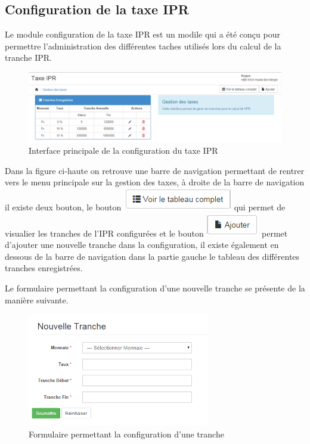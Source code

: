 \documentclass[12pt,a4paper]{report}
\begin{document}
\subsection{Configuration de la taxe IPR}
Le module configuration de la taxe IPR est un modile qui a été conçu pour permettre l'administration des différentes taches utilisés lors du calcul de la tranche IPR. 
\begin{figure}[h]
\begin{center}
\includegraphics[width=14cm]{pic/TaxeIPR.png}
\end{center}
\caption{Interface principale de la configuration du taxe IPR}
\label{Interface principale de la configuration du taxe IPR}
\end{figure}

Dans la figure ci-haute on retrouve une barre de navigation permettant de rentrer vers le menu principale sur la gestion des taxes, à droite de la barre de navigation il existe deux bouton, le bouton \includegraphics[scale=1]{pic/TabComplet.png} qui permet de visualier les tranches de l'IPR configurées et le bouton \includegraphics[scale=1]{pic/AddIPR.png} permet d'ajouter une nouvelle tranche dans la configuration, il existe également en dessous de la barre de navigation dans la partie gauche le tableau des différentes tranches enregistrées.

Le formulaire permettant la configuration d'une nouvelle tranche se présente de la manière suivante. 

\begin{figure}[h]
\begin{center}
\includegraphics[width=8cm]{pic/NouvTranche.png}
\end{center}
\caption{Formulaire permettant la configuration d'une tranche}
\label{Formulaire permettant la configuration d'une tranche}
\end{figure} 
\end{document}
